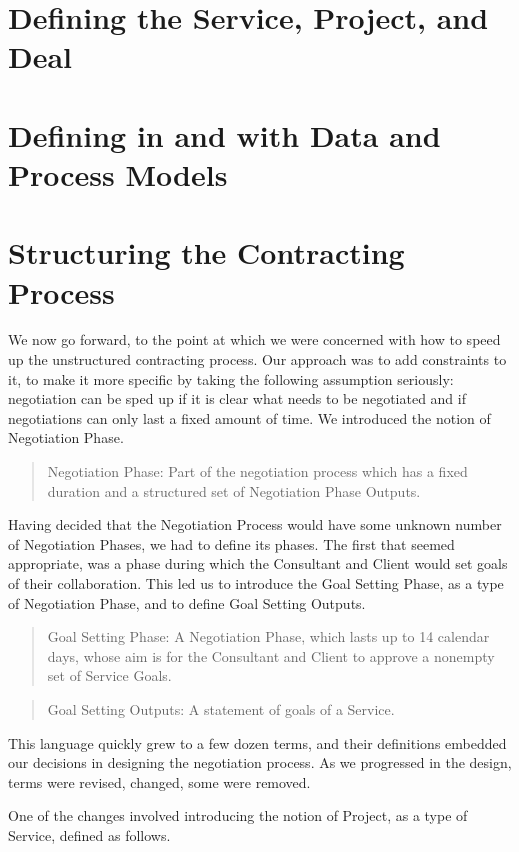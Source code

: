 \documentclass[graybox,envcountchap,sectrefs]{svmono}
\newcommand{\newterm}[1]{\begin{quote}\textsf{#1}\end{quote}}
\newcommand{\nterm}[1]{\textsf{#1}}
\begin{document}
\section{Defining the Service, Project, and Deal}



\section{Defining in and with Data and Process Models}




\section{Structuring the Contracting Process}
We now go forward, to the point at which we were concerned with how to speed up the unstructured contracting process. Our approach was to add constraints to it, to make it more specific by taking the following assumption seriously: negotiation can be sped up if it is clear what needs to be negotiated and if negotiations can only last a fixed amount of time. We introduced the notion of \nterm{Negotiation Phase}.

\newterm{Negotiation Phase: Part of the negotiation process which has a fixed duration and a structured set of Negotiation Phase Outputs.}

Having decided that the \nterm{Negotiation Process} would have some unknown number of \nterm{Negotiation Phases}, we had to define its phases. The first that seemed appropriate, was a phase during which the Consultant and Client would set goals of their collaboration. This led us to introduce the Goal Setting Phase, as a type of Negotiation Phase, and to define Goal Setting Outputs.

\newterm{Goal Setting Phase: A Negotiation Phase, which lasts up to 14 calendar days, whose aim is for the Consultant and Client to approve a nonempty set of Service Goals.}

\newterm{Goal Setting Outputs: A statement of goals of a Service.}

This language quickly grew to a few dozen terms, and their definitions embedded our decisions in designing the negotiation process. As we progressed in the design, terms were revised, changed, some were removed.

One of the changes involved introducing the notion of Project, as a type of Service, defined as follows.
\end{document}
